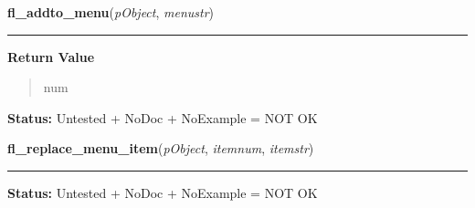     \label{xformslib:library:fl_addto_menu}

    \vspace{0.5ex}

\hspace{.8\funcindent}\begin{boxedminipage}{\funcwidth}

    \raggedright \textbf{fl\_addto\_menu}(\textit{pObject}, \textit{menustr})

    \vspace{-1.5ex}

    \rule{\textwidth}{0.5\fboxrule}
\setlength{\parskip}{2ex}
\setlength{\parskip}{1ex}
      \textbf{Return Value}
    \vspace{-1ex}

      \begin{quote}
      num

      \end{quote}

\textbf{Status:} Untested + NoDoc + NoExample = NOT OK



    \end{boxedminipage}

    \label{xformslib:library:fl_replace_menu_item}

    \vspace{0.5ex}

\hspace{.8\funcindent}\begin{boxedminipage}{\funcwidth}

    \raggedright \textbf{fl\_replace\_menu\_item}(\textit{pObject}, \textit{itemnum}, \textit{itemstr})

    \vspace{-1.5ex}

    \rule{\textwidth}{0.5\fboxrule}
\setlength{\parskip}{2ex}
\setlength{\parskip}{1ex}
\textbf{Status:} Untested + NoDoc + NoExample = NOT OK



    \end{boxedminipage}

    \label{xformslib:library:fl_delete_menu_item}

